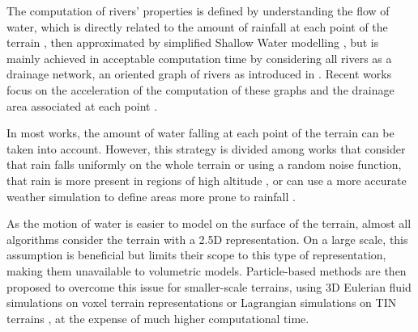 The computation of rivers' properties is defined by understanding the flow of water, which is directly related to the amount of rainfall at each point of the terrain \cite{Kelley1988}, then approximated by simplified Shallow Water modelling \cite{Mei2007}, but is mainly achieved in acceptable computation time by considering all rivers as a drainage network, an oriented graph of rivers as introduced in \cite{Roudier1993}. Recent works focus on the acceleration of the computation of these graphs and the drainage area associated at each point \cite{Cordonnier2016,Schott2023}.

In most works, the amount of water falling at each point of the terrain can be taken into account. However, this strategy is divided among works that consider that rain falls uniformly on the whole terrain or using a random noise function, that rain is more present in regions of high altitude \cite{Neidhold2005}, or can use a more accurate weather simulation to define areas more prone to rainfall \cite{Wojtek2022}.

As the motion of water is easier to model on the surface of the terrain, almost all algorithms consider the terrain with a 2.5D representation. On a large scale, this assumption is beneficial but limits their scope to this type of representation, making them unavailable to volumetric models. Particle-based methods are then proposed to overcome this issue for smaller-scale terrains, using 3D Eulerian fluid simulations on voxel terrain representations \cite{Benes2006} or Lagrangian simulations on TIN terrains \cite{Kristof2009}, at the expense of much higher computational time.


